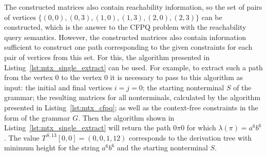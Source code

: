 The constructed matrices also contain reachability information, so the set of pairs of vertices $\{(0, 0), (0, 3), (1, 0), (1, 3), (2, 0), (2, 3)\}$ can be constructed, which is the answer to the CFPQ problem with the reachability query semantics. However, the constructed matrices also contain information sufficient to construct one path corresponding to the given constraints for each pair of vertices from this set. For this, the algorithm presented in Listing~\ref{lst:mtx_single_extract} can be used. For example, to extract such a path from the vertex 0 to the vertex 0 it is necessary to pass to this algorithm as input: the initial and final vertices $i = j = 0$; the starting nonterminal $S$ of the grammar; the resulting matrices for all nonterminals, calculated by the algorithm presented in Listing~\ref{lst:mtx_cfpq}; as well as the context-free constraints in the form of the grammar $G$. Then the algorithm shown in Listing~\ref{lst:mtx_single_extract} will return the path $0\pi 0$ for which $\lambda(\pi) = a^6 b^6$. The value $T^{S, 13}[0, 0] = (0, 0, 1, 12)$ corresponds to the derivation tree with minimum height for the string $a^6 b^6$ and the starting nonterminal $S$.

